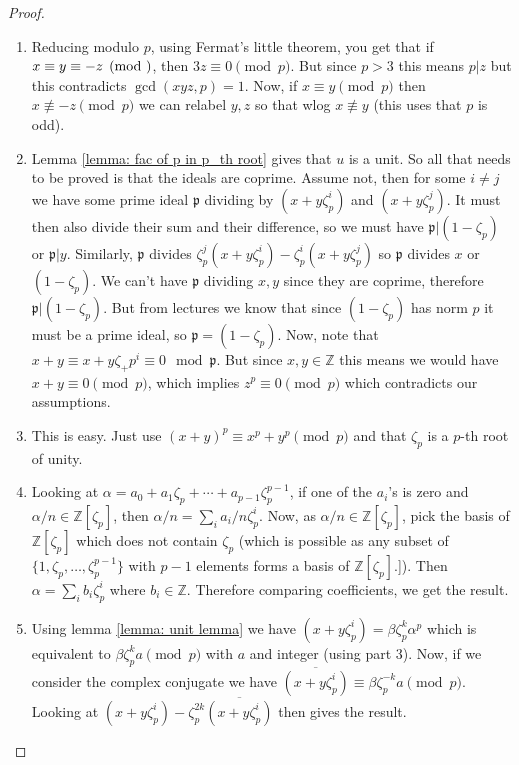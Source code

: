 \documentclass[11pt,a4paper]{amsart}
\theoremstyle{plain}
\theoremstyle{definition}
\theoremstyle{definition}
\newcommand{\ZZ}{\mathbb{Z}}
\def\gothp{\mathfrak{p}}
\def \a{\alpha}
\def \ov{\overline}
\begin{document}
	
	
	\begin{proof}
		
		\begin{enumerate}
			\item   Reducing modulo $p$, using Fermat's little theorem, you get that if $x \equiv y \equiv -z \pmod $, then $3z \equiv 0 \pmod p$. But since $p >3$ this means $p |z$ but this contradicts $\gcd(xyz,p)=1$. Now, if $x \equiv y \pmod p$ then  $x \not \equiv -z \pmod p$ we can relabel $y,z$ so that wlog $x \not \equiv y$ (this uses that $p$ is odd). 
			
			
			\item  Lemma \ref{lemma: fac of p in p_th root} gives that $u$ is a unit. So all that needs to be proved is that the ideals are coprime. Assume not, then for some $i \neq j$ we have some prime ideal $\gothp$ dividing by $(x+y\zeta_p^i)$ and $(x+y\zeta_p^j)$. It must then also divide their sum and their difference, so we must have $\gothp | (1-\zeta_p)$ or $\gothp | y$. Similarly, $\gothp$ divides $\zeta_p^j(x+y\zeta_p^i)-\zeta_p^i(x+y\zeta_p^j)$ so $\gothp$ divides $x$ or $(1-\zeta_p)$. We can't have $\gothp$ dividing $x,y$ since they are coprime, therefore $\gothp |(1-\zeta_p)$. But from lectures we know that since $(1-\zeta_p)$ has norm $p$ it must be a prime ideal, so $\gothp=(1-\zeta_p)$. Now, note that $x+y \equiv x+y\zeta_+p^i \equiv 0 \mod \gothp$. But since $x,y \in \ZZ$ this means we would have $x+y \equiv 0 \pmod p$, which implies $z^p \equiv 0 \pmod p$ which contradicts our assumptions.
			
			\item This is easy. Just use $(x+y)^p \equiv x^p + y^p \pmod p$ and that $\zeta_p$ is a $p$-th root of unity.
			
			\item  Looking at $\a=a_0+a_1\zeta_p+\cdots+a_{p-1}\zeta_p^{p-1}$, if one of the $a_i$'s is zero and $\a/n \in \ZZ[\zeta_p]$, then $\a/n=\sum_i a_i/n \zeta_p^i$. Now, as $\a/n \in \ZZ[\zeta_p]$, pick the basis of $\ZZ[\zeta_p]$ which does not contain $\zeta_p$ (which is possible as any subset of $\{1,\zeta_p,\dots,\zeta_p^{p-1}\}$ with $p-1$ elements forms a basis of $\ZZ[\zeta_p]$.]). Then $\a=\sum_i b_i \zeta_p^i$ where $b_i \in \ZZ$. Therefore comparing coefficients, we get the result.
			
			\item  Using lemma \ref{lemma: unit lemma} we have $(x+y\zeta_p^i) =\beta \zeta_p^k \a^p$ which is equivalent to $\beta \zeta_p^k a \pmod p$ with $a$ and integer (using part $3$). Now, if we consider the complex conjugate we have $\ov{(x+y\zeta_p^i)  }\equiv \beta \zeta_p^{-k}a \pmod p$. Looking at $(x+y\zeta_p^i)-\zeta_p^{2k}\ov{(x+y\zeta_p^i)  }$ then gives the result.
			
			
			
			
		\end{enumerate}
		
	\end{proof}
	
\end{document}
